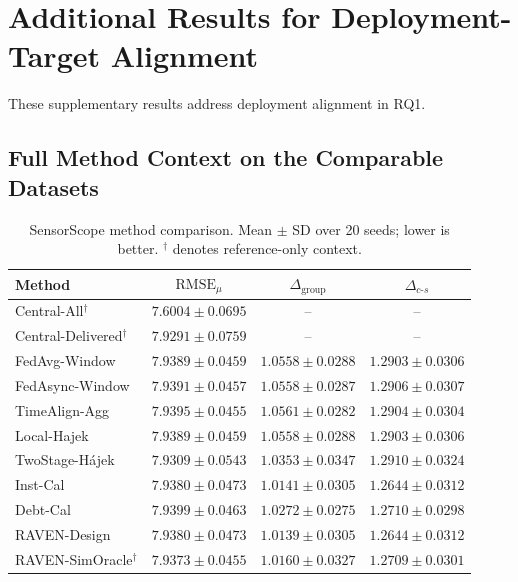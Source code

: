 \section{Additional Results for Deployment-Target Alignment}

These supplementary results address deployment alignment in RQ1.

\subsection{Full Method Context on the Comparable Datasets}

\begin{table}[!htbp]
\centering
\caption{SensorScope method comparison.
Mean $\pm$ SD over 20 seeds; lower is better.
$^\dagger$ denotes reference-only context.}
\label{tab:app_e3_sensorscope}
\footnotesize
\setlength{\tabcolsep}{1.5pt}
\begin{tabular*}{\columnwidth}{@{\extracolsep{\fill}}lccc}
\toprule
Method & $\mathrm{RMSE}_{\mu}$ & $\Delta_{\mathrm{group}}$ & $\Delta_{c\text{-}s}$\\
\midrule
Central-All$^{\dagger}$ & $7.6004\pm0.0695$ & -- & -- \\
Central-Delivered$^{\dagger}$ & $7.9291\pm0.0759$ & -- & -- \\
FedAvg-Window & $7.9389\pm0.0459$ & $1.0558\pm0.0288$ & $1.2903\pm0.0306$ \\
FedAsync-Window & $7.9391\pm0.0457$ & $1.0558\pm0.0287$ & $1.2906\pm0.0307$ \\
TimeAlign-Agg & $7.9395\pm0.0455$ & $1.0561\pm0.0282$ & $1.2904\pm0.0304$ \\
Local-Hajek & $7.9389\pm0.0459$ & $1.0558\pm0.0288$ & $1.2903\pm0.0306$ \\
TwoStage-H\'ajek & $7.9309\pm0.0543$ & $1.0353\pm0.0347$ & $1.2910\pm0.0324$ \\
Inst-Cal & $7.9380\pm0.0473$ & $1.0141\pm0.0305$ & $1.2644\pm0.0312$ \\
Debt-Cal & $7.9399\pm0.0463$ & $1.0272\pm0.0275$ & $1.2710\pm0.0298$ \\
RAVEN-Design & $7.9380\pm0.0473$ & $1.0139\pm0.0305$ & $1.2644\pm0.0312$ \\
RAVEN-SimOracle$^{\dagger}$ & $7.9373\pm0.0455$ & $1.0160\pm0.0327$ & $1.2709\pm0.0301$ \\
\bottomrule
\end{tabular*}
\end{table}

